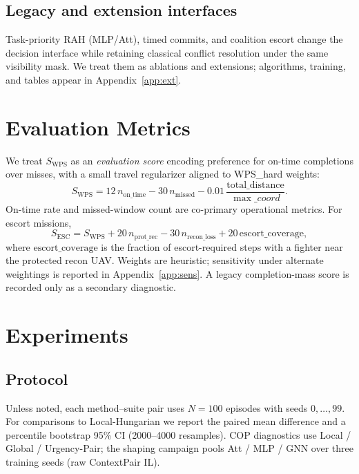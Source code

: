 \documentclass[journal,twocolumn,10pt]{IEEEtran}
\begin{document}
\subsection{Legacy and extension interfaces}
Task-priority RAH (MLP/Att), timed commits, and coalition escort change the decision interface while retaining classical conflict resolution under the same visibility mask.
We treat them as ablations and extensions; algorithms, training, and tables appear in Appendix~\ref{app:ext}.

\section{Evaluation Metrics}
\label{sec:metrics}
We treat \(S_{\mathrm{WPS}}\) as an \emph{evaluation score} encoding preference for on-time completions over misses, with a small travel regularizer aligned to WPS\_hard weights:
\begin{equation}
S_{\mathrm{WPS}}
=
12\,n_{\mathrm{on\_time}}
-
30\,n_{\mathrm{missed}}
-
0.01\,\frac{\mathrm{total\_distance}}{\max\_coord}.
\label{eq:swps}
\end{equation}
On-time rate and missed-window count are co-primary operational metrics.
For escort missions,
\begin{equation}
S_{\mathrm{ESC}}
=
S_{\mathrm{WPS}}
+
20\,n_{\mathrm{prot\_rec}}
-
30\,n_{\mathrm{recon\_loss}}
+
20\,\mathrm{escort\_coverage},
\label{eq:sesc}
\end{equation}
where \(\mathrm{escort\_coverage}\) is the fraction of escort-required steps with a fighter near the protected recon UAV.
Weights are heuristic; sensitivity under alternate weightings is reported in Appendix~\ref{app:sens}.
A legacy completion-mass score is recorded only as a secondary diagnostic.

\section{Experiments}
\subsection{Protocol}
Unless noted, each method--suite pair uses \(N{=}100\) episodes with seeds \(0,\ldots,99\).
For comparisons to Local-Hungarian we report the paired mean difference and a percentile bootstrap 95\% CI (2000--4000 resamples).
COP diagnostics use Local / Global / Urgency-Pair; the shaping campaign pools Att / MLP / GNN over three training seeds (raw ContextPair IL).
\end{document}
